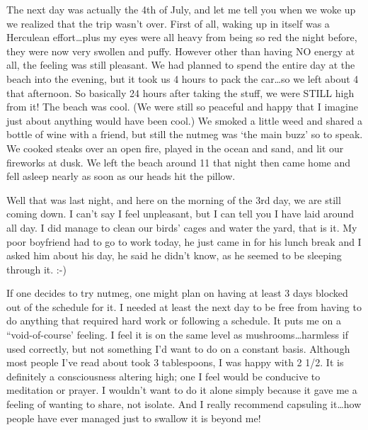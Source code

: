 \documentclass[letterpaper,12pt]{article}
\begin{document}
The next day was actually the 4th of July, and let me tell you when we woke up we realized that the trip wasn't over.  First of all, waking up in itself was a Herculean effort\ldots plus my eyes were all heavy from being so red the night before, they were now very swollen and puffy.  However other than having NO energy at all, the feeling was still pleasant.  We had planned to spend the entire day at the beach into the evening, but it took us 4 hours to pack the car\ldots so we left about 4 that afternoon.  So basically 24 hours after taking the stuff, we were STILL high from it!  The beach was cool.  (We were still so peaceful and happy that I imagine just about anything would have been cool.) We smoked a little weed and shared a bottle of wine with a friend, but still the nutmeg was `the main buzz' so to speak.  We cooked steaks over an open fire, played in the ocean and sand, and lit our fireworks at dusk.  We left the beach around 11 that night then came home and fell asleep nearly as soon as our heads hit the pillow.



Well that was last night, and here on the morning of the 3rd day, we are still coming down.  I can't say I feel unpleasant, but I can tell you I have laid around all day.  I did manage to clean our birds' cages and water the yard, that is it. My poor boyfriend had to go to work today, he just came in for his lunch break and I asked him about his day, he said he didn't know, as he seemed to be sleeping through it. :-)



If one decides to try nutmeg, one might plan on having at least 3 days blocked out of the schedule for it. I needed at least the next day to be free from having to do anything that required hard work or following a schedule. It puts me on a ``void-of-course' feeling. I feel it is on the same level as mushrooms\ldots harmless if used correctly, but not something I'd want to do on a constant basis. Although most people I've read about took 3 tablespoons, I was happy with 2 1/2. It is definitely a consciousness altering high; one I feel would be conducive to meditation or prayer. I wouldn't want to do it alone simply because it gave me a feeling of wanting to share, not isolate.  And I really recommend capsuling it\ldots how people have ever managed just to swallow it is beyond me!
\end{document}
